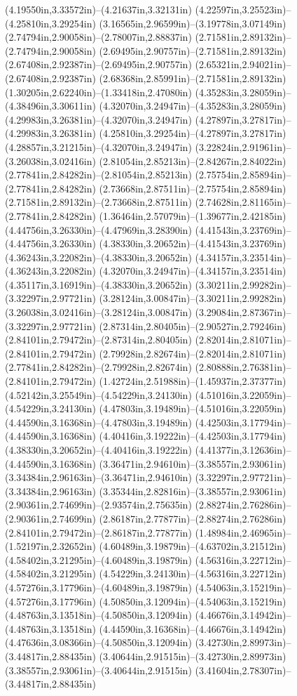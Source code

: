(4.19550in,3.33572in)--(4.21637in,3.32131in) (4.22597in,3.25523in)--(4.25810in,3.29254in) (3.16565in,2.96599in)--(3.19778in,3.07149in) (2.74794in,2.90058in)--(2.78007in,2.88837in) (2.71581in,2.89132in)--(2.74794in,2.90058in) (2.69495in,2.90757in)--(2.71581in,2.89132in) (2.67408in,2.92387in)--(2.69495in,2.90757in) (2.65321in,2.94021in)--(2.67408in,2.92387in) (2.68368in,2.85991in)--(2.71581in,2.89132in) (1.30205in,2.62240in)--(1.33418in,2.47080in) (4.35283in,3.28059in)--(4.38496in,3.30611in) (4.32070in,3.24947in)--(4.35283in,3.28059in) (4.29983in,3.26381in)--(4.32070in,3.24947in) (4.27897in,3.27817in)--(4.29983in,3.26381in) (4.25810in,3.29254in)--(4.27897in,3.27817in) (4.28857in,3.21215in)--(4.32070in,3.24947in) (3.22824in,2.91961in)--(3.26038in,3.02416in) (2.81054in,2.85213in)--(2.84267in,2.84022in) (2.77841in,2.84282in)--(2.81054in,2.85213in) (2.75754in,2.85894in)--(2.77841in,2.84282in) (2.73668in,2.87511in)--(2.75754in,2.85894in) (2.71581in,2.89132in)--(2.73668in,2.87511in) (2.74628in,2.81165in)--(2.77841in,2.84282in) (1.36464in,2.57079in)--(1.39677in,2.42185in) (4.44756in,3.26330in)--(4.47969in,3.28390in) (4.41543in,3.23769in)--(4.44756in,3.26330in) (4.38330in,3.20652in)--(4.41543in,3.23769in) (4.36243in,3.22082in)--(4.38330in,3.20652in) (4.34157in,3.23514in)--(4.36243in,3.22082in) (4.32070in,3.24947in)--(4.34157in,3.23514in) (4.35117in,3.16919in)--(4.38330in,3.20652in) (3.30211in,2.99282in)--(3.32297in,2.97721in) (3.28124in,3.00847in)--(3.30211in,2.99282in) (3.26038in,3.02416in)--(3.28124in,3.00847in) (3.29084in,2.87367in)--(3.32297in,2.97721in) (2.87314in,2.80405in)--(2.90527in,2.79246in) (2.84101in,2.79472in)--(2.87314in,2.80405in) (2.82014in,2.81071in)--(2.84101in,2.79472in) (2.79928in,2.82674in)--(2.82014in,2.81071in) (2.77841in,2.84282in)--(2.79928in,2.82674in) (2.80888in,2.76381in)--(2.84101in,2.79472in) (1.42724in,2.51988in)--(1.45937in,2.37377in) (4.52142in,3.25549in)--(4.54229in,3.24130in) (4.51016in,3.22059in)--(4.54229in,3.24130in) (4.47803in,3.19489in)--(4.51016in,3.22059in) (4.44590in,3.16368in)--(4.47803in,3.19489in) (4.42503in,3.17794in)--(4.44590in,3.16368in) (4.40416in,3.19222in)--(4.42503in,3.17794in) (4.38330in,3.20652in)--(4.40416in,3.19222in) (4.41377in,3.12636in)--(4.44590in,3.16368in) (3.36471in,2.94610in)--(3.38557in,2.93061in) (3.34384in,2.96163in)--(3.36471in,2.94610in) (3.32297in,2.97721in)--(3.34384in,2.96163in) (3.35344in,2.82816in)--(3.38557in,2.93061in) (2.90361in,2.74699in)--(2.93574in,2.75635in) (2.88274in,2.76286in)--(2.90361in,2.74699in) (2.86187in,2.77877in)--(2.88274in,2.76286in) (2.84101in,2.79472in)--(2.86187in,2.77877in) (1.48984in,2.46965in)--(1.52197in,2.32652in) (4.60489in,3.19879in)--(4.63702in,3.21512in) (4.58402in,3.21295in)--(4.60489in,3.19879in) (4.56316in,3.22712in)--(4.58402in,3.21295in) (4.54229in,3.24130in)--(4.56316in,3.22712in) (4.57276in,3.17796in)--(4.60489in,3.19879in) (4.54063in,3.15219in)--(4.57276in,3.17796in) (4.50850in,3.12094in)--(4.54063in,3.15219in) (4.48763in,3.13518in)--(4.50850in,3.12094in) (4.46676in,3.14942in)--(4.48763in,3.13518in) (4.44590in,3.16368in)--(4.46676in,3.14942in) (4.47636in,3.08366in)--(4.50850in,3.12094in) (3.42730in,2.89973in)--(3.44817in,2.88435in) (3.40644in,2.91515in)--(3.42730in,2.89973in) (3.38557in,2.93061in)--(3.40644in,2.91515in) (3.41604in,2.78307in)--(3.44817in,2.88435in) 